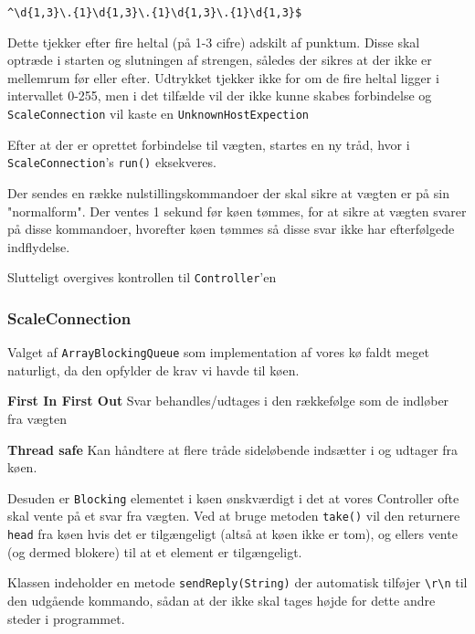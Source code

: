 \documentclass[a4paper]{article}
\newenvironment{my_itemize}
{\begin{itemize}
  \setlength{\itemsep}{1pt}
  \setlength{\parskip}{0pt}
  \setlength{\parsep}{0pt}}
{\end{itemize}}
\begin{document}
\begin{verbatim}
^\d{1,3}\.{1}\d{1,3}\.{1}\d{1,3}\.{1}\d{1,3}$ 
\end{verbatim}

Dette tjekker efter fire heltal (på 1-3 cifre) adskilt af punktum. Disse skal optræde i starten og slutningen af strengen, således der sikres at der ikke er mellemrum før eller efter. Udtrykket tjekker ikke for om de fire heltal ligger i intervallet 0-255, men i det tilfælde vil der ikke kunne skabes forbindelse og \texttt{ScaleConnection} vil kaste en \texttt{UnknownHostExpection}

Efter at der er oprettet forbindelse til vægten, startes en ny tråd, hvor i \texttt{ScaleConnection}'s \texttt{run()} eksekveres.

Der sendes en række nulstillingskommandoer der skal sikre at vægten er på sin "normalform". Der ventes 1 sekund før køen tømmes, for at sikre at vægten svarer på disse kommandoer, hvorefter køen tømmes så disse svar ikke har efterfølgede indflydelse.

Slutteligt overgives kontrollen til \texttt{Controller}'en


\subsubsection{ScaleConnection} %

Valget af \texttt{ArrayBlockingQueue} som implementation af vores kø faldt meget naturligt, da den opfylder de krav vi havde til køen.

\begin{my_itemize}
  \item \textbf{First In First Out} Svar behandles/udtages i den rækkefølge som de indløber fra vægten
  \item \textbf{Thread safe} Kan håndtere at flere tråde sideløbende indsætter i og udtager fra køen.
\end{my_itemize}

Desuden er \texttt{Blocking} elementet i køen ønskværdigt i det at vores Controller ofte skal vente på et svar fra vægten. Ved at bruge metoden \texttt{take()} vil den returnere \texttt{head} fra køen hvis det er tilgængeligt (altså at køen ikke er tom), og ellers vente (og dermed blokere) til at et element er tilgængeligt.

Klassen indeholder en metode \texttt{sendReply(String)} der automatisk tilføjer \texttt{\textbackslash r\textbackslash n} til den udgående kommando, sådan at der ikke skal tages højde for dette andre steder i programmet.
\end{document}
